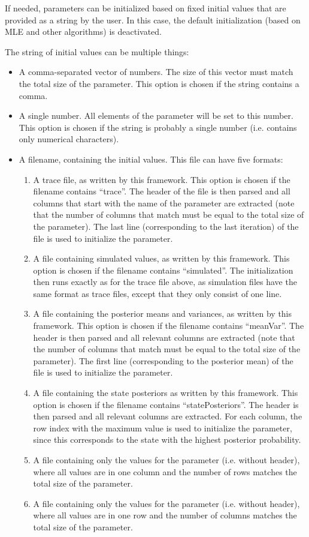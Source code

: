 \documentclass[a4paper,11pt]{article}
\begin{document}
If needed, parameters can be initialized based on fixed initial values that are provided as a string by the user. In this case, the default initialization (based on MLE and other algorithms) is deactivated.

The string of initial values can be multiple things:
\begin{itemize}
 \item A comma-separated vector of numbers. The size of this vector must match the total size of the parameter. This option is chosen if the string contains a comma.
 \item A single number. All elements of the parameter will be set to this number. This option is chosen if the string is probably a single number (i.e. contains only numerical characters).
 \item A filename, containing the initial values. This file can have five formats:
 \begin{enumerate}
 \item A trace file, as written by this framework. This option is chosen if the filename contains ``trace''. The header of the file is then parsed and all columns that start with the name of the parameter are extracted (note that the number of columns that match must be equal to the total size of the parameter). The last line (corresponding to the last iteration) of the file is used to initialize the parameter.
 \item A file containing simulated values, as written by this framework. This option is chosen if the filename contains ``simulated''. The initialization then runs exactly as for the trace file above, as simulation files have the same format as trace files, except that they only consist of one line.
 \item A file containing the posterior means and variances, as written by this framework. This option is chosen if the filename contains ``meanVar''. The header is then parsed and all relevant columns are extracted (note that the number of columns that match must be equal to the total size of the parameter). The first line (corresponding to the posterior mean) of the file is used to initialize the parameter.
 \item A file containing the state posteriors as written by this framework. This option is chosen if the filename contains ``statePosteriors''. The header is then parsed and all relevant columns are extracted. For each column, the row index with the maximum value is used to initialize the parameter, since this corresponds to the state with the highest posterior probability.
  \item A file containing only the values for the parameter (i.e. without header), where all values are in one column and the number of rows matches the total size of the parameter.
  \item A file containing only the values for the parameter (i.e. without header), where all values are in one row and the number of columns matches the total size of the parameter.
 \end{enumerate}
\end{itemize}
\end{document}
